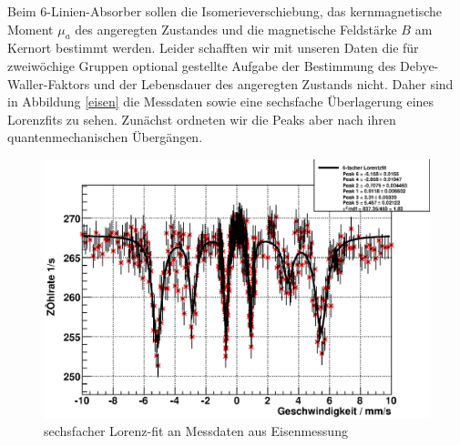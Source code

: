 \documentclass[12pt]{article}
\begin{document}
Beim 6-Linien-Absorber sollen die Isomerieverschiebung, das kernmagnetische Moment $\mu_a$ des angeregten Zustandes und die magnetische Feldstärke $B$
am Kernort bestimmt werden. Leider schafften wir mit unseren Daten die für zweiwöchige Gruppen optional gestellte Aufgabe der Bestimmung des
Debye-Waller-Faktors und der Lebensdauer des angeregten Zustands nicht. Daher sind in Abbildung \ref{eisen} die Messdaten sowie eine sechsfache
Überlagerung eines Lorenzfits zu sehen. Zunächst ordneten wir die Peaks aber nach ihren quantenmechanischen Übergängen. 
\begin{figure}[H]
 \includegraphics[width=0.9\linewidth]{pictures/eisen.eps}
 \caption{sechsfacher Lorenz-fit an Messdaten aus Eisenmessung}
\end{figure}
\end{document}
